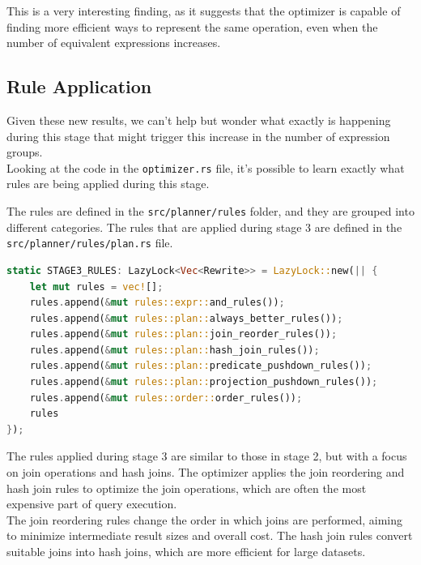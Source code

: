 \documentclass[a4paper,12pt]{scrreprt}
\begin{document}
This is a very interesting finding, as it suggests that the optimizer is capable of finding more efficient ways to represent the same operation, even when the number of equivalent expressions increases. 

\subsection{Rule Application}

Given these new results, we can't help but wonder what exactly is happening during this stage that might trigger this increase in the number of expression groups. \\ Looking at the code in the \texttt{optimizer.rs} file, it's possible to learn exactly what rules are being applied during this stage. 

The rules are defined in the \texttt{src/planner/rules} folder, and they are grouped into different categories. The rules that are applied during stage 3 are defined in the \texttt{src/planner/rules/plan.rs} file. 

\begin{lstlisting}[language=Rust]
static STAGE3_RULES: LazyLock<Vec<Rewrite>> = LazyLock::new(|| {
    let mut rules = vec![];
    rules.append(&mut rules::expr::and_rules());
    rules.append(&mut rules::plan::always_better_rules());
    rules.append(&mut rules::plan::join_reorder_rules());
    rules.append(&mut rules::plan::hash_join_rules());
    rules.append(&mut rules::plan::predicate_pushdown_rules());
    rules.append(&mut rules::plan::projection_pushdown_rules());
    rules.append(&mut rules::order::order_rules());
    rules
});
\end{lstlisting}

The rules applied during stage 3 are similar to those in stage 2, but with a focus on join operations and hash joins. The optimizer applies the join reordering and hash join rules to optimize the join operations, which are often the most expensive part of query execution.\\
The join reordering rules change the order in which joins are performed, aiming to minimize intermediate result sizes and overall cost. The hash join rules convert suitable joins into hash joins, which are more efficient for large datasets.
\end{document}

